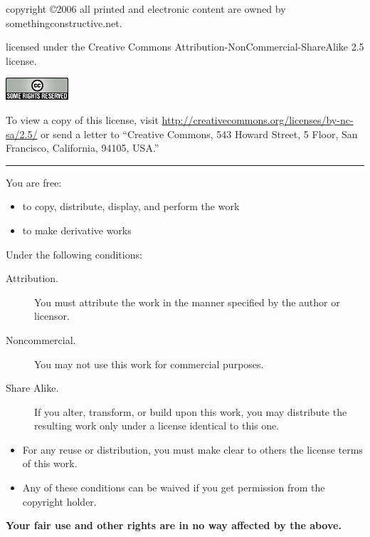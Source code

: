 \begin{center}

  copyright \copyright 2006 all printed and electronic content are
  owned by somethingconstructive.net.

  \bigskip

  licensed under the Creative Commons
  Attribution-\-NonCommercial-\-ShareAlike 2.5 license.

  \medskip

  \includegraphics{cc.png}

  \medskip

  To view a copy of this license, visit
  \href{http://creativecommons.org/licenses/by-nc-sa/2.5/}{http://creativecommons.org/licenses/by-nc-sa/2.5/}
  or send a letter to ``Creative Commons, 543 Howard Street,
  5 Floor, San Francisco, California, 94105, USA.''

\rule{4cm}{1pt}

\end{center}

\noindent You are free:

\begin{itemize}
  \item to copy, distribute, display, and perform the work
  \item to make derivative works
\end{itemize}

\noindent Under the following conditions:

\begin{description}

  \item[Attribution.] You must attribute the work in the manner
  specified by the author or licensor.

  \item[Noncommercial.] You may not use this work for commercial purposes.

  \item[Share Alike.] If you alter, transform, or build upon this
  work, you may distribute the resulting work only under a license
  identical to this one.

\end{description}

\begin{itemize}

    \item For any reuse or distribution, you must make clear to others
    the license terms of this work.

    \item Any of these conditions can be waived if you get permission
    from the copyright holder.

\end{itemize}

\noindent\textbf{Your fair use and other rights are in no way affected
by the above.}

\clearpage
